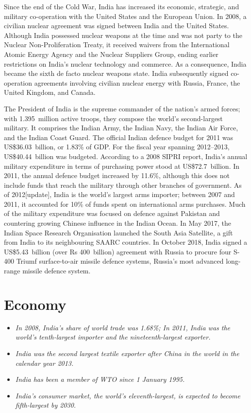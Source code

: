 Since the end of the Cold War, India has increased its economic,
strategic, and military co-operation with the United States and the
European Union. In 2008, a civilian nuclear agreement was signed between
India and the United States. Although India possessed nuclear weapons at
the time and was not party to the Nuclear Non-Proliferation Treaty, it
received waivers from the International Atomic Energy Agency and the
Nuclear Suppliers Group, ending earlier restrictions on India's nuclear
technology and commerce. As a consequence, India became the sixth de
facto nuclear weapons state. India subsequently signed co-operation
agreements involving civilian nuclear energy with Russia, France, the
United Kingdom, and Canada.

The President of India is the supreme commander of the nation's armed
forces; with 1.395~million active troops, they compose the world's
second-largest military. It comprises the Indian Army, the Indian Navy,
the Indian Air Force, and the Indian Coast Guard. The official Indian
defence budget for 2011 was US\$36.03~billion, or 1.83\% of GDP. For the
fiscal year spanning 2012--2013, US\$40.44~billion was budgeted.
According to a 2008 SIPRI report, India's annual military expenditure in
terms of purchasing power stood at US\$72.7~billion. In 2011, the annual
defence budget increased by 11.6\%, although this does not include funds
that reach the military through other branches of government. As of
2012{[}update{]}, India is the world's largest arms importer; between
2007 and 2011, it accounted for 10\% of funds spent on international
arms purchases. Much of the military expenditure was focused on defence
against Pakistan and countering growing Chinese influence in the Indian
Ocean. In May 2017, the Indian Space Research Organisation launched the
South Asia Satellite, a gift from India to its neighbouring SAARC
countries. In October 2018, India signed a US\$5.43~billion (over Rs
400~billion) agreement with Russia to procure four S-400 Triumf
surface-to-air missile defence systems, Russia's most advanced
long-range missile defence system.

\section{Economy}\label{economy}

\begin{itemize}
\item
  \emph{In 2008, India's share of world trade was 1.68\%; In 2011, India
  was the world's tenth-largest importer and the nineteenth-largest
  exporter.}
\item
  \emph{India was the second largest textile exporter after China in the
  world in the calendar year 2013.}
\item
  \emph{India has been a member of WTO since 1 January 1995.}
\item
  \emph{India's consumer market, the world's eleventh-largest, is
  expected to become fifth-largest by 2030.}
\end{itemize}

